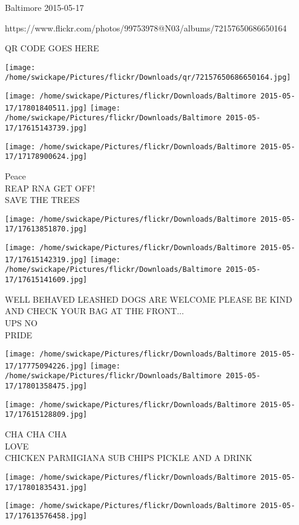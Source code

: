 \documentclass[10pt,letterpaper]{article}
\begin{document}
Baltimore 2015-05-17

https://www.flickr.com/photos/99753978@N03/albums/72157650686650164

QR CODE GOES HERE

\texttt{[image: /home/swickape/Pictures/flickr/Downloads/qr/72157650686650164.jpg]}
\pagebreak

\texttt{[image: /home/swickape/Pictures/flickr/Downloads/Baltimore 2015-05-17/17801840511.jpg]}
\texttt{[image: /home/swickape/Pictures/flickr/Downloads/Baltimore 2015-05-17/17615143739.jpg]}

\texttt{[image: /home/swickape/Pictures/flickr/Downloads/Baltimore 2015-05-17/17178900624.jpg]}

Peace\\
REAP RNA GET OFF!\\
SAVE THE TREES\\
\pagebreak

\texttt{[image: /home/swickape/Pictures/flickr/Downloads/Baltimore 2015-05-17/17613851870.jpg]}

\vspace{0.25in}
\texttt{[image: /home/swickape/Pictures/flickr/Downloads/Baltimore 2015-05-17/17615142319.jpg]}
\texttt{[image: /home/swickape/Pictures/flickr/Downloads/Baltimore 2015-05-17/17615141609.jpg]}

WELL BEHAVED LEASHED DOGS ARE WELCOME PLEASE BE KIND AND CHECK YOUR BAG AT THE FRONT...\\
UPS NO\\
PRIDE\\
\pagebreak

\texttt{[image: /home/swickape/Pictures/flickr/Downloads/Baltimore 2015-05-17/17775094226.jpg]}
\texttt{[image: /home/swickape/Pictures/flickr/Downloads/Baltimore 2015-05-17/17801358475.jpg]}

\texttt{[image: /home/swickape/Pictures/flickr/Downloads/Baltimore 2015-05-17/17615128809.jpg]}

CHA CHA CHA\\
LOVE\\
CHICKEN PARMIGIANA SUB CHIPS PICKLE AND A DRINK\\
\pagebreak

\texttt{[image: /home/swickape/Pictures/flickr/Downloads/Baltimore 2015-05-17/17801835431.jpg]}

\vspace{0.25in}
\texttt{[image: /home/swickape/Pictures/flickr/Downloads/Baltimore 2015-05-17/17613576458.jpg]}
\end{document}
